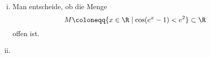 \begin{enumerate}[(i)]
    \item Man entscheide, ob die Menge 
    \[
        M\coloneqq \{  x\in \R \mid \cos(e^x-1) < e^2\} \subset \R    
    \] offen ist.
    \item 
\end{enumerate}